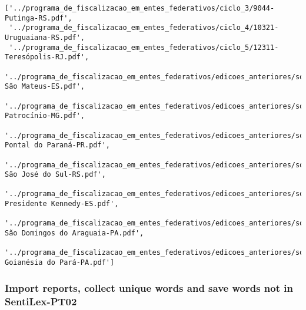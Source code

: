 \begin{lstlisting}
['../programa_de_fiscalizacao_em_entes_federativos/ciclo_3/9044-Putinga-RS.pdf',
 '../programa_de_fiscalizacao_em_entes_federativos/ciclo_4/10321-Uruguaiana-RS.pdf',
 '../programa_de_fiscalizacao_em_entes_federativos/ciclo_5/12311-Teresópolis-RJ.pdf',
 '../programa_de_fiscalizacao_em_entes_federativos/edicoes_anteriores/sorteio_34/1837-São Mateus-ES.pdf',
 '../programa_de_fiscalizacao_em_entes_federativos/edicoes_anteriores/sorteio_35/1906-Patrocínio-MG.pdf',
 '../programa_de_fiscalizacao_em_entes_federativos/edicoes_anteriores/sorteio_36/2483-Pontal do Paraná-PR.pdf',
 '../programa_de_fiscalizacao_em_entes_federativos/edicoes_anteriores/sorteio_37/2871-São José do Sul-RS.pdf',
 '../programa_de_fiscalizacao_em_entes_federativos/edicoes_anteriores/sorteio_38/2975-Presidente Kennedy-ES.pdf',
 '../programa_de_fiscalizacao_em_entes_federativos/edicoes_anteriores/sorteio_39/3179-São Domingos do Araguaia-PA.pdf',
 '../programa_de_fiscalizacao_em_entes_federativos/edicoes_anteriores/sorteio_40/3390-Goianésia do Pará-PA.pdf']
\end{lstlisting}

\subsubsection{Import reports, collect unique words and save words not
in
SentiLex-PT02}\label{import-reports-collect-unique-words-and-save-words-not-in-sentilex-pt02}

